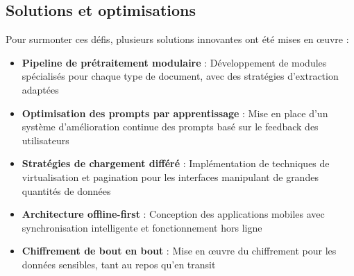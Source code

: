 \subsection{Solutions et optimisations}

Pour surmonter ces défis, plusieurs solutions innovantes ont été mises en œuvre :

\begin{itemize}
  \item \textbf{Pipeline de prétraitement modulaire} : Développement de modules spécialisés pour chaque type de document, avec des stratégies d'extraction adaptées
  
  \item \textbf{Optimisation des prompts par apprentissage} : Mise en place d'un système d'amélioration continue des prompts basé sur le feedback des utilisateurs
  
  \item \textbf{Stratégies de chargement différé} : Implémentation de techniques de virtualisation et pagination pour les interfaces manipulant de grandes quantités de données
  
  \item \textbf{Architecture offline-first} : Conception des applications mobiles avec synchronisation intelligente et fonctionnement hors ligne
  
  \item \textbf{Chiffrement de bout en bout} : Mise en œuvre du chiffrement pour les données sensibles, tant au repos qu'en transit
\end{itemize}
